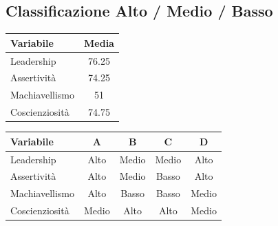 \documentclass[compress]{beamer}
\begin{document}
\subsection*{Classificazione Alto / Medio / Basso}

\begin{frame}
	
\centering
		\begin{tabular}{lc}
			\hline
			\textbf{Variabile} & \textbf{Media} \\
			\hline
			Leadership & 76.25  \\
			Assertività & 74.25 \\
			Machiavellismo & 51  \\
			Coscienziosità & 74.75  \\
			\hline
		\end{tabular}
	
\vspace{3mm}

\begin{tabular}{lcccc}
	\hline
	\textbf{Variabile} & \textbf{A} & \textbf{B} & \textbf{C} & \textbf{D} \\
	\hline
	Leadership & Alto & Medio & Medio & Alto \\
	Assertività & Alto & Medio & Basso & Alto \\
	Machiavellismo & Alto & Basso & Basso & Medio \\
	Coscienziosità & Medio & Alto & Alto & Medio \\
	\hline
\end{tabular}
\end{frame}
\end{document}
